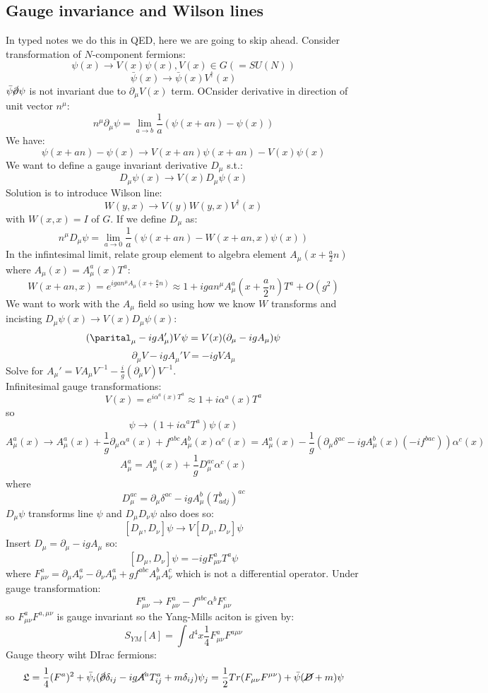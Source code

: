 \documentclass{article}
\begin{document}
        \subsection{Gauge invariance and Wilson lines}
In typed notes we do this in QED, here we are going to skip ahead.
Consider transformation of $N$-component fermions:
$$
 \psi(x) \rightarrow V(x) \psi(x), V(x) \in G (=SU(N))
$$
$$
 \bar \psi(x) \rightarrow \bar \psi(x) V^{\dagger} (x)
$$
$\bar \psi \cancel \partial \psi$ is not invariant due to $\partial_{\mu} V(x)$ term. OCnsider derivative in direction of unit vector $n^{\mu}$:
$$
 n^{\mu} \partial_{\mu} \psi = \lim_{a \rightarrow b} \frac{1}{a} ( \psi(x+ an) - \psi(x))
$$
We have:
$$
 \psi(x + an) - \psi(x) \rightarrow V(x+an) \psi(x+ an) - V(x) \psi(x)
$$
We want to define a gauge invariant derivative $D_{\mu}$ s.t.:
$$
 D_{\mu} \psi(x) \rightarrow V(x) D_{\mu} \psi(x)
$$
Solution is to introduce Wilson line:
$$
 W(y,x) \rightarrow V(y) W(y,x) V^{\dagger}(x)
$$
with $W(x,x) = I$ of $G$. If we define $D_{\mu}$ as:
$$
n^{\mu} D_{\mu} \psi = \lim_{a \rightarrow 0} \frac{1}{a} ( \psi( x+ an) - W( x+ an, x) \psi(x))
$$
In the infintesimal limit, relate group element to algebra element $A_{\mu} (x+ \frac{a}{2}n)$ where $A_{\mu} (x) = A_{\mu}^a (x) T^a$:
$$
 W( x+an, x) = e^{i g an^{\mu} A_{\mu} ( x+ \frac{a}{2} n)} \approx 1 + i g a n^{\mu} A_{\mu}^a ( x+ \frac{a}{2} n) T^a + O ( g^2)
$$
We want to work with the $A_{\mu}$ field so using how we know $W$ transforms and incisting $D_{\mu} \psi(x) \rightarrow V(x) D_{\mu} \psi(x)$:
$$
 ( \parital_{\mu} - i g A'_{\mu}) V \psi = V(x) ( \partial_{\mu} -ig A_{\mu}) \psi
$$
$$
 \partial_{\mu} V - i g A_{\mu}' V = - i g V A_{\mu}
$$
Solve for $A_{\mu}' = V A_{\mu} V^{-1} - \frac{i}{g} ( \partial_{\mu} V) V^{-1}$. \\Infinitesimal gauge transformations:
$$
V(x) = e^{i \alpha^a(x) T^a} \approx 1 + i \alpha^a (x) T^a
$$
so
$$
 \psi \rightarrow (1+ i \alpha^a T^a) \psi(x)
$$
$$
 A_{\mu}^a (x) \rightarrow A_{\mu}^a(x) + \frac{1}{g} \partial_{\mu} \alpha^a(x) + f^{abc} A_{\mu}^b(x) \alpha^c(x) = A_{\mu}^a(x) - \frac{1}{g} ( \partial_{\mu} \delta^{ac} - ig A_{\mu}^b(x) ( -if^{bac}) ) \alpha^c(x)
$$
$$
 A_{\mu}^a = A_{\mu} ^a(x) + \frac{1}{g} D_{\mu}^{ac} \alpha^c(x)
$$
where
$$
 D_{\mu}^{ac} = \partial_{\mu} \delta^{ac} - ig A_{\mu}^b( T^b_{adj})^{ac}
$$
$D_{\mu} \psi$ transforms line $\psi$ and $D_{\mu} D_{\nu} \psi$ also does so:
$$
 [ D_{\mu} , D_{\nu} ] \psi \rightarrow V [ D_{\mu}, D_{\nu}] \psi
$$
Insert $D_{\mu} = \partial_{\mu} - i g A_{\mu}$ so:
$$
 [D_{\mu}, D_{\nu}] \psi = - ig F_{\mu \nu}^a T^a \psi 
$$
       where $F_{\mu \nu}^a = \partial_{\mu} A_{\nu}^a - \partial_{\nu} A_{\mu}^a + g f^{abc} A_{\mu}^b A_{\nu}^c$ which is not a differential operator.  Under gauge transformation:
       $$
        F_{\mu \nu}^a \rightarrow F_{\mu \nu}^a - f^{abc} \alpha^b F^c_{\mu \nu}
       $$
       so $F^a_{\mu \nu} F^{a, \mu \nu}$ is gauge invariant so the Yang-Mills aciton is given by:
       $$
       S_{YM} [A] = \int d^4 x \frac{1}{4} F_{\mu \nu}^a F^{a \mu \nu}
       $$
       Gauge theory wiht DIrac fermions:
       $$
        \mathfrak{L} = \frac{1}{4} ( F^a)^2 + \bar \psi_i ( \cancel \partial \delta_{ij} - i g \cancel A^a T^a_{ij} + m \delta_{ij}) \psi_j = \frac{1}{2} Tr ( F_{\mu \nu} F^{\mu \nu}) + \bar \psi( \cancel D + m ) \psi
       $$
\end{document}
